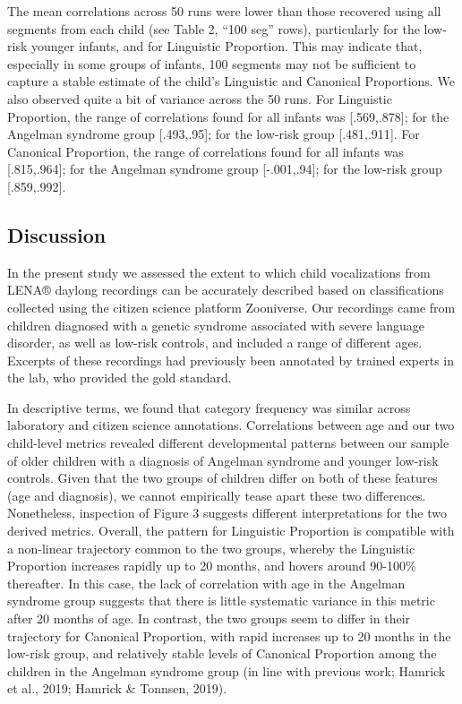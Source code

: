 \documentclass[english,,man]{apa6}
\begin{document}
The mean correlations across 50 runs were lower than those recovered using all segments from each child (see Table 2, \enquote{100 seg} rows), particularly for the low-risk younger infants, and for Linguistic Proportion. This may indicate that, especially in some groups of infants, 100 segments may not be sufficient to capture a stable estimate of the child's Linguistic and Canonical Proportions. We also observed quite a bit of variance across the 50 runs. For Linguistic Proportion, the range of correlations found for all infants was {[}.569,.878{]}; for the Angelman syndrome group {[}.493,.95{]}; for the low-risk group {[}.481,.911{]}. For Canonical Proportion, the range of correlations found for all infants was {[}.815,.964{]}; for the Angelman syndrome group {[}-.001,.94{]}; for the low-risk group {[}.859,.992{]}.

\hypertarget{discussion}{%
\subsection{Discussion}\label{discussion}}

In the present study we assessed the extent to which child vocalizations from LENA® daylong recordings can be accurately described based on classifications collected using the citizen science platform Zooniverse. Our recordings came from children diagnosed with a genetic syndrome associated with severe language disorder, as well as low-risk controls, and included a range of different ages. Excerpts of these recordings had previously been annotated by trained experts in the lab, who provided the gold standard.

In descriptive terms, we found that category frequency was similar across laboratory and citizen science annotations. Correlations between age and our two child-level metrics revealed different developmental patterns between our sample of older children with a diagnosis of Angelman syndrome and younger low-risk controls. Given that the two groups of children differ on both of these features (age and diagnosis), we cannot empirically tease apart these two differences. Nonetheless, inspection of Figure 3 suggests different interpretations for the two derived metrics. Overall, the pattern for Linguistic Proportion is compatible with a non-linear trajectory common to the two groups, whereby the Linguistic Proportion increases rapidly up to 20 months, and hovers around 90-100\% thereafter. In this case, the lack of correlation with age in the Angelman syndrome group suggests that there is little systematic variance in this metric after 20 months of age. In contrast, the two groups seem to differ in their trajectory for Canonical Proportion, with rapid increases up to 20 months in the low-risk group, and relatively stable levels of Canonical Proportion among the children in the Angelman syndrome group (in line with previous work; Hamrick et al., 2019; Hamrick \& Tonnsen, 2019).
\end{document}
